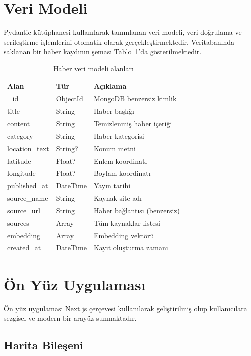 \documentclass[conference]{IEEEtran}
\begin{document}
\section{Veri Modeli}
\label{sec:model}

Pydantic kütüphanesi kullanılarak tanımlanan veri modeli, veri doğrulama ve serileştirme işlemlerini otomatik olarak gerçekleştirmektedir. Veritabanında saklanan bir haber kaydının şeması Tablo~\ref{tab:schema}'da gösterilmektedir.

\begin{table}[H]
\centering
\caption{Haber veri modeli alanları}
\label{tab:schema}
\begin{tabular}{@{}p{2.3cm}p{1.5cm}p{3.5cm}@{}}
\toprule
\textbf{Alan} & \textbf{Tür} & \textbf{Açıklama} \\
\midrule
\_id & ObjectId & MongoDB benzersiz kimlik \\
title & String & Haber başlığı \\
content & String & Temizlenmiş haber içeriği \\
category & String & Haber kategorisi \\
location\_text & String? & Konum metni \\
latitude & Float? & Enlem koordinatı \\
longitude & Float? & Boylam koordinatı \\
published\_at & DateTime & Yayın tarihi \\
source\_name & String & Kaynak site adı \\
source\_url & String & Haber bağlantısı (benzersiz) \\
sources & Array & Tüm kaynaklar listesi \\
embedding & Array & Embedding vektörü \\
created\_at & DateTime & Kayıt oluşturma zamanı \\
\bottomrule
\end{tabular}
\end{table}

\section{Ön Yüz Uygulaması}
\label{sec:frontend}

Ön yüz uygulaması Next.js çerçevesi kullanılarak geliştirilmiş olup kullanıcılara sezgisel ve modern bir arayüz sunmaktadır.

\subsection{Harita Bileşeni}
\end{document}
